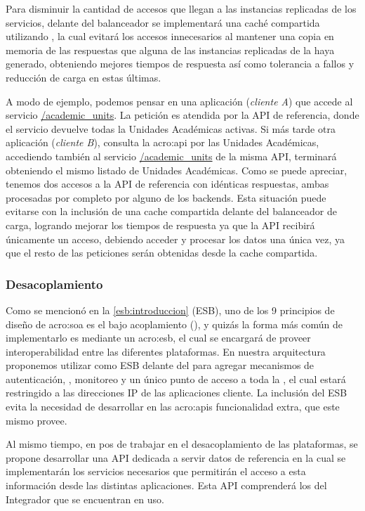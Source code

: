 Para disminuir la cantidad de accesos que llegan a las instancias replicadas de los servicios, delante del balanceador se implementará una caché compartida utilizando , la cual evitará los accesos innecesarios al mantener una copia en memoria de las respuestas que alguna de las instancias replicadas de la {\cloud} haya generado, obteniendo mejores tiempos de respuesta así como tolerancia a fallos y reducción de carga en estas últimas.

A modo de ejemplo, podemos pensar en una aplicación (\textit{cliente A}) que accede al servicio \url{/academic_units}. La petición es atendida por la API de referencia, donde el servicio devuelve todas la Unidades Académicas activas. Si más tarde otra aplicación (\textit{cliente B}), consulta la \gls{acro:api} por las Unidades Académicas, accediendo también al servicio \url{/academic_units} de la misma API, terminará obteniendo el mismo listado de Unidades Académicas. Como se puede apreciar, tenemos dos accesos a la API de referencia con idénticas respuestas, ambas procesadas por completo por alguno de los backends. Esta situación puede evitarse con la inclusión de una cache compartida delante del balanceador de carga, logrando mejorar los tiempos de respuesta ya que la API recibirá únicamente un acceso, debiendo acceder y procesar los datos una única vez, ya que el resto de las peticiones serán obtenidas desde la cache compartida.


\subsubsection{Desacoplamiento}

Como se mencionó en la \autoref{esb:introduccion} (ESB), uno de los 9 principios de diseño de \gls{acro:soa} es el bajo acoplamiento (), y quizás la forma más común de implementarlo es mediante un \gls{acro:esb}, el cual se encargará de proveer interoperabilidad entre las diferentes plataformas.  En nuestra arquitectura proponemos utilizar  como ESB delante del  para agregar mecanismos de autenticación, , monitoreo y un único punto de acceso a toda la {\cloud}, el cual estará restringido a las direcciones IP de las aplicaciones cliente. La inclusión del ESB evita la necesidad de desarrollar en las \glspl{acro:api} funcionalidad extra, que este mismo provee.

Al mismo tiempo, en pos de trabajar en el desacoplamiento de las plataformas, se propone desarrollar una API dedicada a servir datos de referencia en la cual se implementarán los servicios necesarios que permitirán el acceso a esta información desde las distintas aplicaciones.  Esta API comprenderá los  del Integrador que se encuentran en uso.

